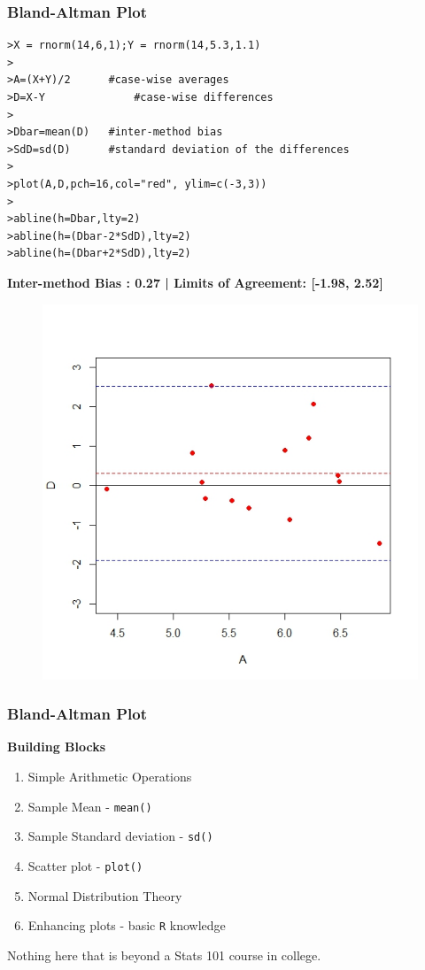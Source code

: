 \documentclass[compress]{beamer}        %
\begin{document}
\begin{frame}[fragile]
\frametitle{Bland-Altman Plot}
\vspace{-0.3cm}
\begin{framed}
\begin{verbatim}
>X = rnorm(14,6,1);Y = rnorm(14,5.3,1.1)
>
>A=(X+Y)/2		#case-wise averages
>D=X-Y			    #case-wise differences
>		
>Dbar=mean(D)	#inter-method bias
>SdD=sd(D)		#standard deviation of the differences
>
>plot(A,D,pch=16,col="red", ylim=c(-3,3))
>
>abline(h=Dbar,lty=2)
>abline(h=(Dbar-2*SdD),lty=2)
>abline(h=(Dbar+2*SdD),lty=2)
\end{verbatim}
\end{framed}
\end{frame}
\begin{frame}
	\vspace{-0.1cm}
	\textbf{Inter-method Bias : 0.27 | Limits of Agreement: [-1.98, 2.52]}
	\vspace{-0.2cm}
	\begin{figure}
		\centering
		\includegraphics[width=0.7\linewidth]{NewBAplot2}
		\label{fig:SimpleBAplot2}
	\end{figure}
	
	
\end{frame}
\begin{frame}[fragile]
	\frametitle{Bland-Altman Plot}
	\vspace{-0.2cm}
\large
\textbf{Building Blocks}
\begin{enumerate}
\item Simple Arithmetic Operations
\item Sample Mean  - \texttt{mean()}
\item Sample Standard deviation - \texttt{sd()}
\item Scatter plot  - \texttt{plot()}
\item Normal Distribution Theory
\item Enhancing plots  - basic \texttt{R} knowledge 
\end{enumerate}

Nothing here that is beyond a Stats 101 course in college.
\end{frame}
\end{document}
